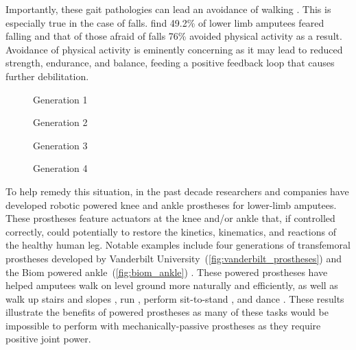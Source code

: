 Importantly, these gait pathologies can lead an avoidance of walking
\citep{gauthier1999enabling}. This is especially true in the case of falls.
\citet{miller2001prevalence} find 49.2\% of lower limb amputees feared falling
and that of those afraid of falls 76\% avoided physical activity as a result.
Avoidance of physical activity is eminently concerning as it may lead to reduced
strength, endurance, and balance, feeding a positive feedback loop that causes
further debilitation.

\begin{marginfigure}
    \centering
    \caption{Biom Robotic Ankle Prosthesis}
    \label{fig:biom_ankle}
\end{marginfigure}

\begin{figure*}[b]
    \centering
	\begin{subfigure}[b]{0.2\textwidth}
    	\centering
        \caption{Generation 1}
	\end{subfigure}
	\begin{subfigure}[b]{0.2\textwidth}
    	\centering
        \caption{Generation 2}
	\end{subfigure}
	\begin{subfigure}[b]{0.2\textwidth}
    	\centering
        \caption{Generation 3}
	\end{subfigure}
	\begin{subfigure}[b]{0.2\textwidth}
    	\centering
        \caption{Generation 4}
	\end{subfigure}
    \caption{Vanderbilt University's Robotic Transfemoral
    Prostheses.\vspace{0.1in}}
    \label{fig:vanderbilt_prostheses}
\end{figure*}


To help remedy this situation, in the past decade researchers and companies have
developed robotic powered knee and ankle prostheses for lower-limb amputees.
These prostheses feature actuators at the knee and/or ankle that, if controlled
correctly, could potentially to restore the kinetics, kinematics, and reactions
of the healthy human leg. Notable examples include four generations of
transfemoral prostheses developed by Vanderbilt
University~(\cref{fig:vanderbilt_prostheses}) \citep{sup2007design,
sup2009preliminary, lawson2013control, lawson2014robotic} and the Biom powered
ankle~(\cref{fig:biom_ankle}) \citep{herr2012bionic}. These powered prostheses
have helped amputees walk on level ground more naturally and efficiently, as
well as walk up stairs and slopes \citep{sup2011upslope, lawson2013control}, run
\citep{huff2012running, shultz2015running}, perform sit-to-stand
\citep{varol2009powered}, and dance \citep{rouse2015design}. These results
illustrate the benefits of powered prostheses as many of these tasks would be
impossible to perform with mechanically-passive prostheses as they require
positive joint power.

